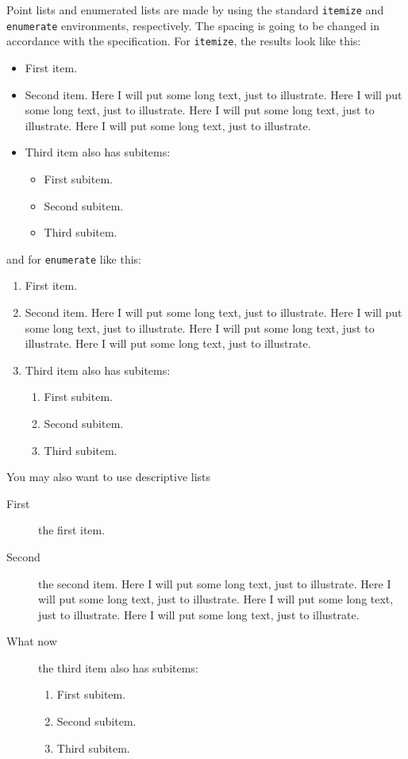 Point lists and enumerated lists are made by using the standard
\texttt{itemize} and \texttt{enumerate} environments, respectively.
The spacing is going to be changed in accordance with the specification. For
\texttt{itemize}, the results look like this:
\begin{itemize}
	\item First item.
	\item Second item. Here I will put some long text, just to illustrate.
	  Here I will put some long text, just to illustrate. Here I will put
	  some long text, just to illustrate. Here I will put some long text,
	  just to illustrate.
	\item Third item also has subitems:
	  \begin{itemize}
		  \item First subitem.
		  \item Second subitem.
		  \item Third subitem.
	  \end{itemize}
\end{itemize}
and for \texttt{enumerate} like this:
\begin{enumerate}
	\item First item.
	\item Second item. Here I will put some long text, just to illustrate.
	  Here I will put some long text, just to illustrate. Here I will put
	  some long text, just to illustrate. Here I will put some long text,
	  just to illustrate.
	\item Third item also has subitems:
	  \begin{enumerate}
		  \item First subitem.
		  \item Second subitem.
		  \item Third subitem.
	  \end{enumerate}
\end{enumerate}

You may also want to use descriptive lists
\begin{description}
	\item[First] the first item.
	\item[Second] the second item. Here I will put some long text, just to illustrate.
	  Here I will put some long text, just to illustrate. Here I will put
	  some long text, just to illustrate. Here I will put some long text,
	  just to illustrate.
	\item [What now] the third item also has subitems:
	  \begin{enumerate}
		  \item First subitem.
		  \item Second subitem.
		  \item Third subitem.
	  \end{enumerate}
\end{description}


